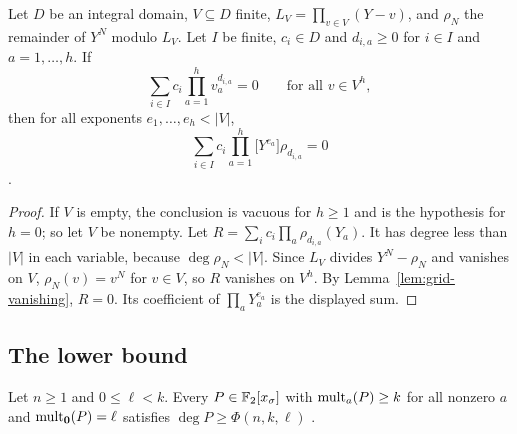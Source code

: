 \begin{lemma}\label{lem:grid-reduction}
Let \(D\) be an integral domain, \(V\subseteq D\) finite,
\(L_V=\prod_{v\in V}(Y-v)\), and \(\rho_N\) the remainder of \(Y^N\) modulo \(L_V\).
Let \(I\) be finite, \(c_i\in D\) and \(d_{i,a}\ge0\) for \(i\in I\) and
\(a=1,\ldots,h\). If
\[
 \sum_{i\in I}c_i\prod_{a=1}^hv_a^{d_{i,a}}=0\qquad\text{for all }v\in V^h,
\]
then for all exponents \(e_1,\ldots,e_h<|V|\),
\[
 \sum_{i\in I}c_i\prod_{a=1}^h\bigl[Y^{e_a}\bigr]\rho_{d_{i,a}}=0
\]
.
\end{lemma}

\begin{proof}
If \(V\) is empty, the conclusion is vacuous for \(h\ge1\) and is the hypothesis
for \(h=0\); so let \(V\) be nonempty. Let \(R=\sum_ic_i\prod_a\rho_{d_{i,a}}(Y_a)\). It has degree less than \(|V|\) in
each variable, because \(\deg\rho_N<|V|\). Since \(L_V\) divides
\(Y^N-\rho_N\) and vanishes on \(V\), \(\rho_N(v)=v^N\) for \(v\in V\), so \(R\)
vanishes on \(V^h\). By Lemma~\ref{lem:grid-vanishing}, \(R=0\). Its coefficient of
\(\prod_aY_a^{e_a}\) is the displayed sum.
\end{proof}

\subsection{The lower bound}

\begin{theorem}\label{thm:per-order-lower}
Let \(n\ge1\) and \(0\le\ell<k\). Every \(P\in\mathbb F_2[x_\sigma]\) with
\(\operatorname{mult}_a(P)\ge k\) for all nonzero \(a\) and \(\operatorname{mult}_{\mathbf 0}(P)=\ell\) satisfies
\(\deg P\ge\Phi(n,k,\ell)\) .
\end{theorem}

